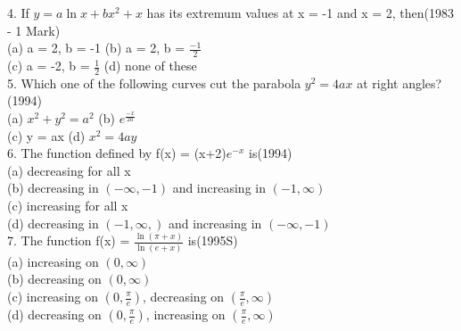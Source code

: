 \documentclass[journal,12pt,twocolumn]{IEEEtran}
\theoremstyle{remark}
\begin{document}
4.  If $y=a\ln x + bx^2 +x$ has its extremum values at \indent x = -1 and x = 2, then\hspace{1.6cm}(1983 - 1 Mark)\\[2pt]\indent (a)\hspace{0.2cm} a = 2, b = -1\hspace{1cm} (b)\hspace{0.2cm} a = 2, b = $\displaystyle\frac{-1}{2}$\\[2pt]\indent (c)\hspace{0.2cm} a = -2, b = $\displaystyle\frac{1}{2}$\hspace{1cm} (d)\hspace{0.2cm} none of these\\[3pt]
5. Which one of the following curves cut the \indent  parabola $y^2 = 4ax$ at right angles?\hspace{1.2cm}(1994)\\[2pt]\indent (a)\hspace{0.2cm} $x^2 + y^2 = a^2$\hspace{2cm} (b)\hspace{0.2cm} $e^{\frac{-x}{2a}}$\\[2pt]\indent (c)\hspace{0.2cm} y = ax\hspace{2.9cm} (d)\hspace{0.2cm} $x^2 = 4ay$\\[3pt]
6.  The function defined by f(x) = (x+2)$e^{-x}$ is\hspace{0.1cm}(1994)\\[2pt]\indent (a)\hspace{0.2cm} decreasing for all x\\[2pt]\indent (b)\hspace{0.2cm} decreasing in $(-\infty, -1)$ and increasing in \indent \indent \indent $(-1, \infty)$\\[2pt]\indent (c)\hspace{0.2cm} increasing for all x\\[2pt]\indent (d)\hspace{0.2cm} decreasing in $(-1, \infty,)$ and increasing in \indent \indent \indent $(-\infty, -1)$\\[3pt]
7.  The function f(x) = $\displaystyle\frac{\ln (\pi + x)}{\ln (e + x)}$ is\hspace{1.5cm}(1995S)\\[2pt]\indent (a)\hspace{0.2cm} increasing on $(0, \infty)$\\[2pt]\indent (b)\hspace{0.2cm} decreasing on $(0, \infty)$\\[2pt]\indent (c)\hspace{0.2cm} increasing on $(0, \displaystyle\frac{\pi}{e})$, decreasing on $(\displaystyle\frac{\pi}{e}, \infty)$\\[2pt]\indent (d)\hspace{0.2cm} decreasing on $(0, \displaystyle\frac{\pi}{e})$, increasing on $(\displaystyle\frac{\pi}{e}, \infty)$\\[3pt]
\end{document}
